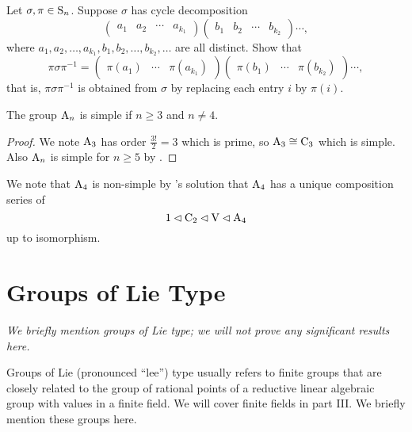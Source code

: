 \begin{exercise}\label{exercise-conjugation-of-permutation-by-another}
    Let $\sigma, \pi \in \mathrm{S}_{n}$. Suppose $\sigma$ has cycle decomposition
    \[
        \begin{pmatrix}a_1&a_2&\cdots&a_{k_1}\end{pmatrix} \begin{pmatrix}b_1&b_2&\cdots&b_{k_2}\end{pmatrix}\cdots,
    \]
    where $a_1, a_2, \dots, a_{k_1}, b_1, b_2, \dots, b_{k_2}, \dots$ are all distinct. Show that
    \[
        \pi\sigma\pi^{-1} = \begin{pmatrix}\pi(a_1)&\cdots&\pi(a_{k_1})\end{pmatrix} \begin{pmatrix}\pi(b_1)&\cdots&\pi(b_{k_2})\end{pmatrix}\cdots,
    \]
    that is, $\pi\sigma\pi^{-1}$ is obtained from $\sigma$ by replacing each entry $i$ by $\pi(i)$.
\end{exercise}

\begin{corollary}
    The group $\mathrm{A}_{n}$ is simple if $n \geq 3$ and $n \neq 4$.
\end{corollary}
\begin{proof}
    We note $\mathrm{A}_{3}$ has order $\frac{3!}{2} = 3$ which is prime, so $\mathrm{A}_{3} \cong \mathrm{C}_{3}$ which is simple. Also $\mathrm{A}_{n}$ is simple for $n \geq 5$ by .
\end{proof}

We note that $\mathrm{A}_{4}$ is non-simple by 's solution that $\mathrm{A}_{4}$ has a unique composition series of
\[
    1 \lhd \mathrm{C}_{2} \lhd \mathrm{V} \lhd \mathrm{A}_{4}
\]
up to isomorphism.

\section{Groups of Lie Type}
\textit{We briefly mention groups of Lie type; we will not prove any significant results here.}

Groups of Lie (pronounced ``lee'') type usually refers to finite groups that are closely related to the group of rational points of a reductive linear algebraic group with values in a finite field. We will cover finite fields in part III. We briefly mention these groups here.

